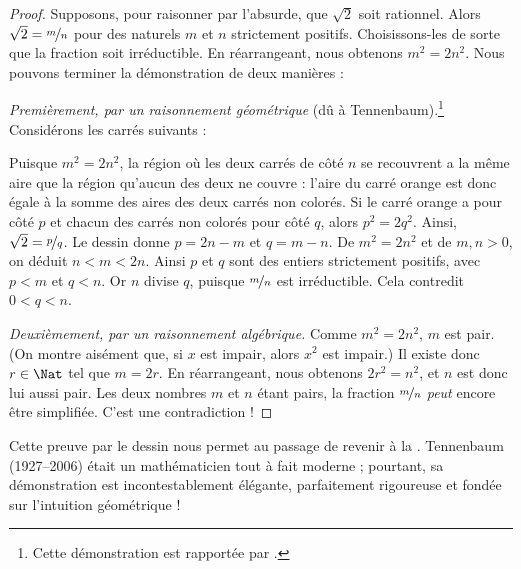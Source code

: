 \documentclass[../../../include/open-logic-section]{subfiles}
\begin{document}
\begin{proof}
Supposons, pour raisonner par l'absurde, que $\sqrt{2}$ soit rationnel.
Alors $\sqrt{2} = \nicefrac{m}{n}$ pour des naturels $m$ et $n$
strictement positifs. Choisissons-les de sorte que la fraction soit
irréductible. En réarrangeant, nous obtenons $m^{2} = 2n^{2}$.
Nous pouvons terminer la démonstration de deux manières :

\emph{Premièrement, par un raisonnement géométrique} (dû à Tennenbaum).\footnote{Cette démonstration est rapportée par \cite{Conway2006}.}
Considérons les carrés suivants :
\begin{center}
\end{center}
Puisque $m^2 = 2n^2$, la région où les deux carrés de côté $n$ se
recouvrent a la même aire que la région qu'aucun des deux ne couvre :
l'aire du carré orange est donc égale à la somme des aires des deux
carrés non colorés. Si le carré orange a pour côté $p$ et chacun des
carrés non colorés pour côté $q$, alors $p^2 = 2q^2$. Ainsi,
$\sqrt{2} = \nicefrac{p}{q}$. Le dessin donne $p=2n-m$ et $q=m-n$.
De $m^2=2n^2$ et de $m,n>0$, on déduit $n<m<2n$. Ainsi $p$ et $q$
sont des entiers strictement positifs, avec $p<m$ et $q<n$.
Or $n$ divise $q$, puisque $\nicefrac{m}{n}$ est irréductible. Cela contredit $0<q<n$.

\emph{Deuxièmement, par un raisonnement algébrique.} Comme
$m^{2} = 2n^{2}$, $m$ est pair. (On montre aisément que, si $x$ est
impair, alors $x^2$ est impair.) Il existe donc $r \in \Nat$ tel que
$m = 2r$. En réarrangeant, nous obtenons $2r^2 = n^2$,
et $n$ est donc lui aussi pair. Les deux nombres $m$ et $n$ étant
pairs, la fraction $\nicefrac{m}{n}$ \emph{peut} encore être simplifiée.
C'est une contradiction !{}
\end{proof}

Cette preuve par le dessin nous permet au passage de revenir à la
. Tennenbaum (1927--2006) était un
mathématicien tout à fait moderne ; pourtant, sa démonstration est
incontestablement élégante, parfaitement rigoureuse et fondée sur
l'intuition géométrique !{}
\end{document}
